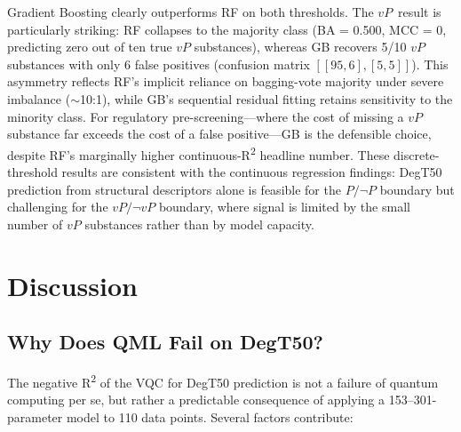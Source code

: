 \documentclass[12pt,a4paper]{article}
\newcommand{\degtl}{DegT50}
\newcommand{\rtwo}{R\textsuperscript{2}}
\newcommand{\nsub}{110}
\begin{document}
Gradient Boosting clearly outperforms RF on both thresholds. The
$vP$~result is particularly striking: RF collapses to the majority class
(BA = 0.500, MCC = 0, predicting zero out of ten true $vP$ substances),
whereas GB recovers 5/10 $vP$ substances with only 6 false positives
(confusion matrix $[[95, 6], [5, 5]]$). This asymmetry reflects RF's
implicit reliance on bagging-vote majority under severe imbalance
($\sim$10:1), while GB's sequential residual fitting retains sensitivity
to the minority class. For regulatory pre-screening---where the cost of
missing a $vP$ substance far exceeds the cost of a false positive---GB
is the defensible choice, despite RF's marginally higher continuous-\rtwo{}
headline number. These discrete-threshold results are consistent with the
continuous regression findings: \degtl{} prediction from structural
descriptors alone is feasible for the $P / \neg P$ boundary but
challenging for the $vP / \neg vP$ boundary, where signal is limited by
the small number of $vP$ substances rather than by model capacity.


\section{Discussion}
\label{sec:discussion}

\subsection{Why Does QML Fail on DegT50?}

The negative \rtwo{} of the VQC for \degtl{} prediction is not a failure
of quantum computing per se, but rather a predictable consequence of
applying a 153--301-parameter model to \nsub{} data points. Several
factors contribute:
\end{document}
